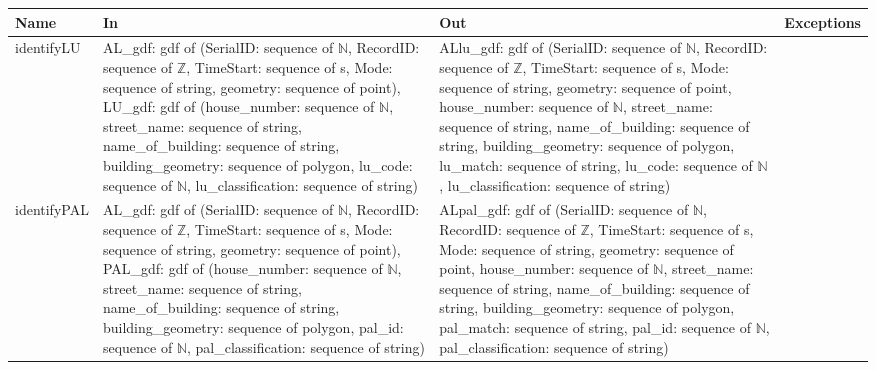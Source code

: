 \documentclass[12pt, titlepage]{article}
\begin{document}
\begin{center}
\begin{longtable}{| l | >{\raggedright}p{5cm} | >{\raggedright}p{4cm} | l |}%
\hline
\textbf{Name} & \textbf{In} & \textbf{Out} & \textbf{Exceptions} \\
\hline
identifyLU & AL\_gdf: gdf of (SerialID: sequence of $\mathbb{N}$, RecordID: sequence of $\mathbb{Z}$, TimeStart: sequence of s, Mode: sequence of string, geometry: sequence of point), \newline \newline LU\_gdf: gdf of (house\_number: sequence of $\mathbb{N}$, street\_name: sequence of string, name\_of\_building: sequence of string, building\_geometry: sequence of polygon, lu\_code: sequence of $\mathbb{N}$, lu\_classification: sequence of string) & ALlu\_gdf: gdf of (SerialID: sequence of $\mathbb{N}$, RecordID: sequence of $\mathbb{Z}$, TimeStart: sequence of s, Mode: sequence of string, geometry: sequence of point, house\_number: sequence of $\mathbb{N}$, street\_name: sequence of string, name\_of\_building: sequence of string, building\_geometry: sequence of polygon, lu\_match: sequence of string, lu\_code: sequence of $\mathbb{N}$, lu\_classification: sequence of string) &\\
\hline
identifyPAL & AL\_gdf: gdf of (SerialID: sequence of $\mathbb{N}$, RecordID: sequence of $\mathbb{Z}$, TimeStart: sequence of s, Mode: sequence of string, geometry: sequence of point), \newline \newline PAL\_gdf: gdf of (house\_number: sequence of $\mathbb{N}$, street\_name: sequence of string, name\_of\_building: sequence of string, building\_geometry: sequence of polygon, pal\_id: sequence of $\mathbb{N}$, pal\_classification: sequence of string) & ALpal\_gdf: gdf of (SerialID: sequence of $\mathbb{N}$, RecordID: sequence of $\mathbb{Z}$, TimeStart: sequence of s, Mode: sequence of string, geometry: sequence of point, house\_number: sequence of $\mathbb{N}$, street\_name: sequence of string, name\_of\_building: sequence of string, building\_geometry: sequence of polygon, pal\_match: sequence of string, pal\_id: sequence of $\mathbb{N}$, pal\_classification: sequence of string) &\\
\hline

\end{longtable}
\end{center}
\end{document}
